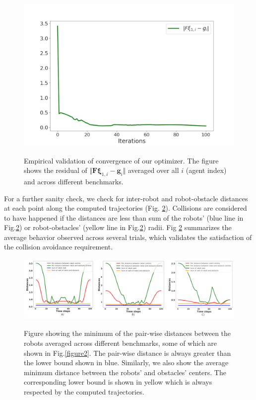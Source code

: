 \begin{figure}
    \centering
    {\includegraphics{figures/gpu_mat/cost_plots.jpg}} 
    \caption[GPU Optimizer Cost Plot]{Empirical validation of convergence of our optimizer. The figure shows the residual of $\Vert \textbf{F}\boldsymbol{\xi}_{1, i}-\textbf{g}_i\Vert$ averaged over all $i$ (agent index) and across different benchmarks.}
    \label{figure4}
\end{figure}

For a further sanity check, we check for inter-robot and robot-obstacle distances at each point along the computed trajectories (Fig. \ref{figure5}). Collisions are considered to have happened if the distances are less than sum of the robots' (blue line in Fig.\ref{figure5}) or robot-obstacles' (yellow line in Fig.\ref{figure5}) radii. Fig \ref{figure5} summarizes the average behavior observed across several trials, which validates the satisfaction of the collision avoidance requirement.




\begin{figure}
    \centering
    {\includegraphics{figures/gpu_mat/min_distances.jpg}} 
    \caption[Minimum pairwise distances in benchmark scenes]{Figure showing the minimum of the pair-wise distances between the robots averaged across different benchmarks, some of which are shown in Fig.\ref{figure2}. The pair-wise distance is always greater than the lower bound shown in blue. Similarly, we also show the average minimum distance between the robots' and obstacles' centers. The corresponding lower bound is shown in yellow which is always respected by the computed trajectories.}
    \label{figure5}
\end{figure}


